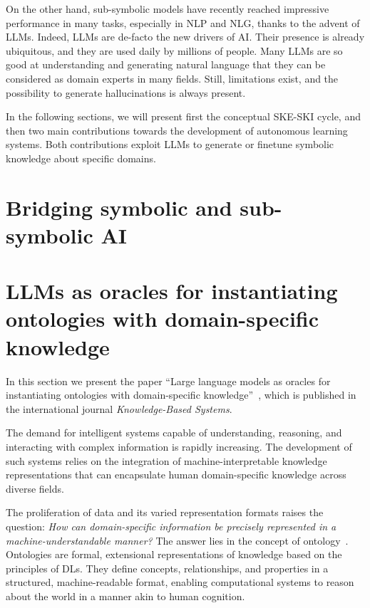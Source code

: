 On the other hand, sub-symbolic models have recently reached impressive performance in many tasks, especially in \gls{NLP} and \gls{NLG}, thanks to the advent of \glspl{LLM}.
%
Indeed, \glspl{LLM} are de-facto the new drivers of \gls{AI}.
%
Their presence is already ubiquitous, and they are used daily by millions of people.
%
Many \glspl{LLM} are so good at understanding and generating natural language that they can be considered as domain experts in many fields.
%
Still, limitations exist, and the possibility to generate hallucinations is always present.


In the following sections, we will present first the conceptual \gls{SKE}-\gls{SKI} cycle, and then two main contributions towards the development of autonomous learning systems.
%
Both contributions exploit \glspl{LLM} to generate or finetune symbolic knowledge about specific domains.


\section{Bridging symbolic and sub-symbolic \gls{AI}}
\label{sec:cycle-ski-ske}



\section{\Glspl{LLM} as oracles for instantiating ontologies with domain-specific knowledge}
\label{sec:llm-as-oracles-for-instantiating-ontologies-with-domain-specific-knowledge}
%
In this section we present the paper ``Large language models as oracles for instantiating ontologies with domain-specific knowledge''~\cite{DBLP:journals/kbs/CiattoAMO25}, which is published in the international journal \emph{Knowledge-Based Systems}.

The demand for intelligent systems capable of understanding, reasoning, and interacting with complex information is rapidly increasing.
%
The development of such systems relies on the integration of machine-interpretable knowledge representations that can encapsulate human domain-specific knowledge across diverse fields.


The proliferation of data and its varied representation formats raises the question: \emph{How can domain-specific information be precisely represented in a machine-understandable manner?}
%
The answer lies in the concept of ontology~\cite{DBLP:books/daglib/p/Grimm10}.
%
Ontologies are formal, extensional representations of knowledge based on the principles of \glspl{DL}.
%
They define concepts, relationships, and properties in a structured, machine-readable format, enabling computational systems to reason about the world in a manner akin to human cognition.


